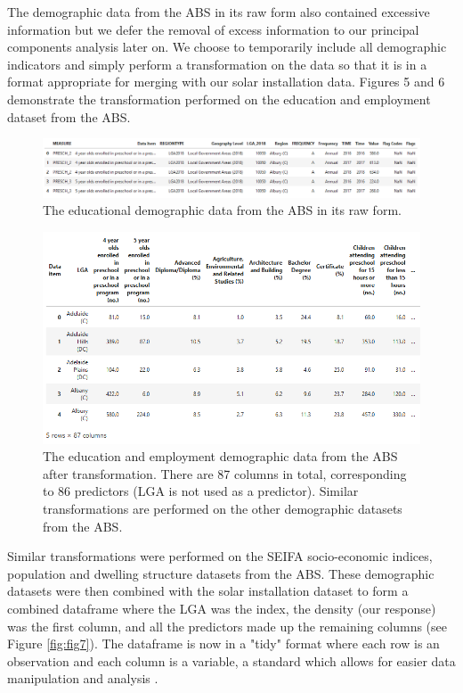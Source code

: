 \documentclass[a4paper]{article}
\begin{document}
The demographic data from the ABS in its raw form also contained excessive information but we defer the removal of excess information to our principal components analysis later on. We choose to temporarily include all demographic indicators and simply perform a transformation on the data so that it is in a format appropriate for merging with our solar installation data. Figures 5 and 6 demonstrate the transformation performed on the education and employment dataset from the ABS. \\

\begin{figure}
\centering
  \includegraphics[width=\linewidth]{fig5.png}
  \caption{The educational demographic data from the ABS in its raw form.}
  \label{fig:fig5}
\end{figure}

\begin{figure}
\centering
  \includegraphics[width=\linewidth]{fig6.png}
  \caption{The education and employment demographic data from the ABS after transformation. There are 87 columns in total, corresponding to 86 predictors (LGA is not used as a predictor). Similar transformations are performed on the other demographic datasets from the ABS.}
  \label{fig:fig6}
\end{figure}

Similar transformations were performed on the SEIFA socio-economic indices, population  and dwelling structure datasets from the ABS. These demographic datasets were then combined with the solar installation dataset to form a combined dataframe where the LGA was the index, the density (our response) was the first column, and all the predictors made up the remaining columns (see Figure \ref{fig:fig7}). The dataframe is now in a "tidy" format where each row is an observation and each column is a variable, a standard which allows for easier data manipulation and analysis \cite{tidy}.
\end{document}
